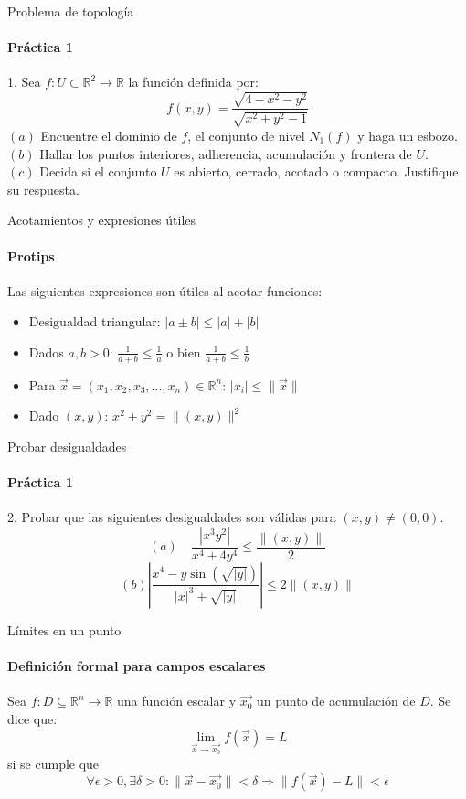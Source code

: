 \documentclass{plantillaPPT}
\begin{document}
\begin{frame}{Problema de topología}
\framesubtitle{Práctica 1}

1. Sea \(f:U\subset\mathbb{R}^2\to\mathbb{R}\) la función definida por: 
\[f(x,y) = \frac{\sqrt{4-x^2-y^2}}{\sqrt{x^2+y^2-1}}\]
\((a)\) Encuentre el dominio de \(f\), el conjunto de nivel \(N_1(f)\) y haga un esbozo.\\
\((b)\) Hallar los puntos interiores, adherencia, acumulación y frontera de \(U\).\\
\((c)\) Decida si el conjunto \(U\) es abierto, cerrado, acotado o compacto. Justifique su respuesta.
    
\end{frame}

\begin{frame}{Acotamientos y expresiones útiles}
\framesubtitle{Protips}

Las siguientes expresiones son útiles al acotar funciones:
\vspace{5pt}
\begin{itemize}
    \item Desigualdad triangular: \(|a\pm b| \leq |a|+|b|\)
    \vspace{5pt}
    \item Dados \(a,b>0\): \(\frac{1}{a+b}\leq\frac{1}{a}\) o bien \(\frac{1}{a+b}\leq\frac{1}{b}\)
    \vspace{5pt}
    \item Para \(\vec{x}=(x_1, x_2, x_3, ..., x_n)\in\mathbb{R}^n\): \(|x_i|\leq\|\vec{x}\|\)
    \vspace{5pt}
    \item Dado \((x,y)\): \(x^2+y^2=\|(x,y)\|^2\)
\end{itemize}
    
\end{frame}

\begin{frame}{Probar desigualdades}
\framesubtitle{Práctica 1}

2. Probar que las siguientes desigualdades son válidas para \((x,y)\neq(0,0)\). \\[5pt]
\[
(a) \quad \frac{|x^3y^2|}{x^4+4y^4}\leq \frac{\|(x,y)\|}{2}
\]
\vspace{10pt}
\[
(b) \left|\frac{x^4-y\sin(\sqrt{|y|})}{|x|^3+\sqrt{|y|}}\right|\leq 2\|(x,y)\|
\]

\end{frame}

\begin{frame}{Límites en un punto}
\framesubtitle{Definición formal para campos escalares}

\begin{definicion}
    Sea \(f:D\subseteq\mathbb{R}^n\to\mathbb{R}\) una función escalar y \(\vec{x_0}\) un punto de acumulación de \(D\). Se dice que:
    \[
    \lim_{\vec{x}\to\vec{x_0}}f(\vec{x}) = L
    \]
    si se cumple que
    \[\forall \epsilon>0, \exists \delta>0: \|\vec{x}-\vec{x_0}\|<\delta \Rightarrow \|f(\vec{x})-L\|<\epsilon\]
\end{definicion}
    
\end{frame}
\end{document}
